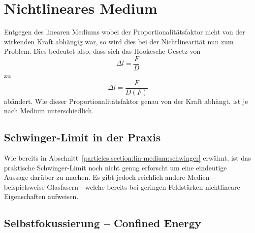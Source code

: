 %
%
%
%
\section{Nichtlineares Medium
\label{particles:section:nichtlinear}}
Entgegen des linearen Mediums wobei der Proportionalitätsfaktor nicht von der wirkenden Kraft abhängig war, 
so wird dies bei der Nichtlinearität nun zum Problem.
Dies bedeutet also, dass sich das Hookesche Gesetz von 
\[
    \Delta l
    = 
    \frac{F}{D}
\]
zu
\[
    \Delta l
    = 
    \frac{F}{D(F)}
\]
abändert. 
Wie dieser Proportionalitätsfaktor genau von der Kraft abhängt, 
ist je nach Medium unterschiedlich.


\subsection{Schwinger-Limit in der Praxis}
Wie bereits in Abschnitt~\ref{particles:section:lin-medium:schwinger} erwähnt, 
ist das praktische Schwinger-Limit noch nicht genug erforscht um eine eindeutige Aussage darüber zu machen.
Es gibt jedoch reichlich andere Medien---beispielsweise Glasfasern---welche bereits bei geringen Feldstärken nichtlineare Eigenschaften aufweisen.


\subsection{Selbstfokussierung -- Confined Energy} %



